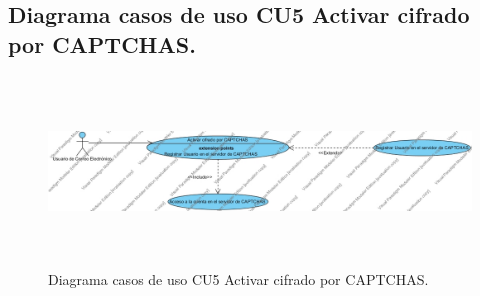 \pagebreak

\subsection{Diagrama casos de uso CU5 Activar cifrado por CAPTCHAS.}
\begin{figure}[H]
	\includegraphics[width=1\linewidth, height=5cm]{./images/casodeuso5.jpg}
	\caption{Diagrama casos de uso CU5 Activar cifrado por CAPTCHAS.}
	\label{fig:4-6-1}
\end{figure}
